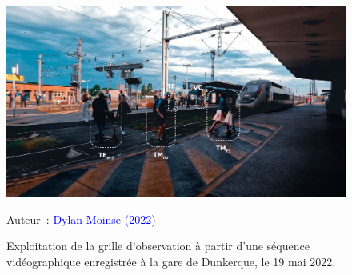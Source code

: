 \begin{refsegment}
    \begin{figure}[h!]\vspace*{4pt}
        \caption{Exploitation de la grille d'observation à partir d'une séquence vidéographique enregistrée à la gare de Dunkerque, le 19 mai 2022.}
        \label{fig-chap3:application-grille-observation-quantitative}
        \centerline{\includegraphics[width=1\columnwidth]{src/Figures/Chap-3/FR_Observation_Codes_Gare_Dunkerque.jpg}}
        \vspace{5pt}
        \begin{flushright}\scriptsize{
        Auteur~: \textcolor{blue}{Dylan Moinse (2022)}
        }\end{flushright}
    \end{figure}
    

\end{refsegment}
